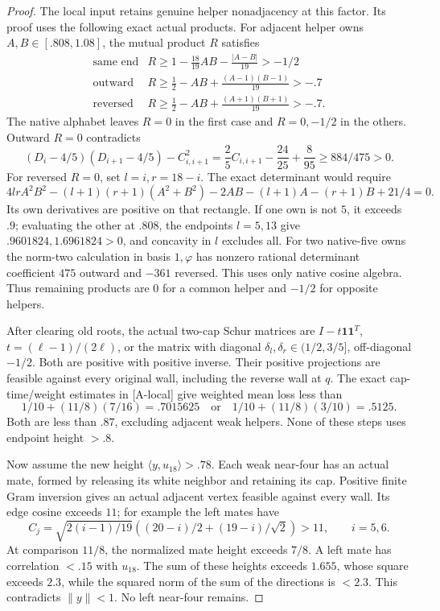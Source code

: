 \documentclass[11pt]{article}
\theoremstyle{definition}
\theoremstyle{remark}
\newcommand{\ip}[2]{\langle #1,#2\rangle}
\newcommand{\norm}[1]{\lVert #1\rVert}
\newcommand{\src}[1]{\textnormal{\textsf{[#1]}}}
\begin{document}
\begin{proof}
The local input retains genuine helper nonadjacency at this
factor. Its proof uses the following exact actual products.
For adjacent helper owns \(A,B\in[.808,1.08]\), the mutual
product \(R\) satisfies
\[
\begin{array}{c|l}
\text{same end}&R\geq1-\frac{18}{19}AB-\frac{|A-B|}{19}>-1/2\\
\text{outward}&R\geq\frac12-AB+\frac{(A-1)(B-1)}{19}>-.7\\
\text{reversed}&R\geq\frac12-AB+\frac{(A+1)(B+1)}{19}>-.7.
\end{array}
\]
The native alphabet leaves \(R=0\) in the first case and
\(R=0,-1/2\) in the others. Outward \(R=0\) contradicts
\[
 (D_i-4/5)(D_{i+1}-4/5)-C_{i,i+1}^2
 =\frac25 C_{i,i+1}-\frac{24}{25}+\frac8{95}
 \geq884/475>0.
\]
For reversed \(R=0\), set \(l=i,r=18-i\).
The exact determinant would require
\[
 4lr A^2B^2-(l+1)(r+1)(A^2+B^2)-2AB
 -(l+1)A-(r+1)B+21/4=0.
\]
Its own derivatives are positive on that rectangle.
If one own is not \(5\), it exceeds \(.9\); evaluating the
other at \(.808\), the endpoints \(l=5,13\) give
\(.9601824,1.6961824>0\), and concavity in \(l\) excludes all.
For two native-five owns the norm-two calculation in basis
\(1,\varphi\) has nonzero rational determinant coefficient
\(475\) outward and \(-361\) reversed. This uses only native
cosine algebra. Thus remaining products are \(0\) for a
common helper and \(-1/2\) for opposite helpers.

After clearing old roots, the actual two-cap Schur matrices
are \(I-t\mathbf1\mathbf1^T\), \(t=(\ell-1)/(2\ell)\), or
the matrix with diagonal
\(\delta_l,\delta_r\in(1/2,3/5]\), off-diagonal \(-1/2\).
Both are positive with positive inverse. Their positive
projections are feasible against every original wall,
including the reverse wall at \(q\).
The exact cap-time/weight estimates in \src{A-local} give
weighted mean loss less than
\[
 1/10+(11/8)(7/16)=.7015625
 \quad\text{or}\quad1/10+(11/8)(3/10)=.5125.
\]
Both are less than \(.87\), excluding adjacent weak helpers.
None of these steps uses endpoint height \(>.8\).

Now assume the new height \(\ip{y}{u_{18}}>.78\).
Each weak near-four has an actual mate, formed by releasing
its white neighbor and retaining its cap. Positive finite
Gram inversion gives an actual adjacent vertex feasible
against every wall. Its edge cosine exceeds \(11\);
for example the left mates have
\[
 C_j=\sqrt{2(i-1)/19}
 \left((20-i)/2+(19-i)/\sqrt2\right)>11,\qquad i=5,6.
\]
At comparison \(11/8\), the normalized mate height exceeds
\(7/8\). A left mate has correlation \(<.15\) with \(u_{18}\).
The sum of these heights exceeds \(1.655\), whose square
exceeds \(2.3\), while the squared norm of the sum of the
directions is \(<2.3\). This contradicts \(\norm{y}<1\).
No left near-four remains.


\end{proof}
\end{document}
